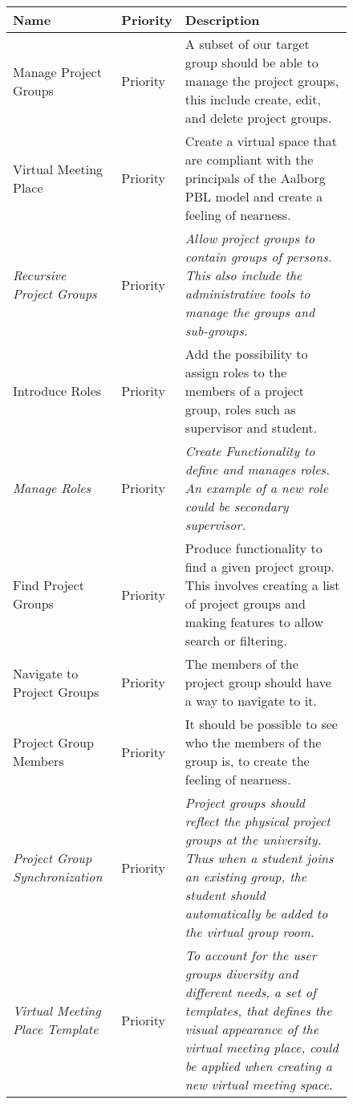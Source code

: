 \begin{figure}%
\begin{tabular}{|p{}|p{}|p{}|}
	\hline
	
	\textbf{Name} & \textbf{Priority} & \textbf{Description} \\
	\hline
	Manage Project Groups & Priority & A subset of our target group should be able to manage the project groups, this include create, edit, and delete project groups.  \\
	\hline
	Virtual Meeting Place & Priority & Create a virtual space that are compliant with the principals of the Aalborg PBL model and create a feeling of nearness.  \\
	\hline
	\textit{Recursive Project Groups} & Priority & \textit{Allow project groups to contain groups of persons. This also include the administrative tools to manage the groups and sub-groups.} \\
	\hline
	Introduce Roles & Priority & Add the possibility to assign roles to the members of a project group, roles such as supervisor and student.   \\
	\hline
	\textit{Manage Roles} & Priority & \textit{Create Functionality to define and manages roles. An example of a new role  could be secondary supervisor.} \\
	\hline
	Find Project Groups & Priority & Produce functionality to find a given project group. This involves creating a list of project groups and making features to allow search or filtering. \\
	\hline
	Navigate to Project Groups & Priority & The members of the project group should have a way to navigate to it. \\
	\hline
	Project Group Members & Priority & It should be possible to see who the members of the group is, to create the feeling of nearness. \\
	\hline
	\textit{Project Group Synchronization} & Priority & \textit{Project groups should reflect the physical project groups at the university. Thus when a student joins an existing group, the student should automatically be added to the virtual group room.}  \\
	\hline 
	\textit{Virtual Meeting Place Template} & Priority & \textit{To account for the user groups diversity and different needs, a set of templates, that defines the visual appearance of the virtual meeting place, could be applied when creating a new virtual meeting space.}  \\
	\hline 
\end{tabular}
\label{fig:productbacklog}
\end{figure}

